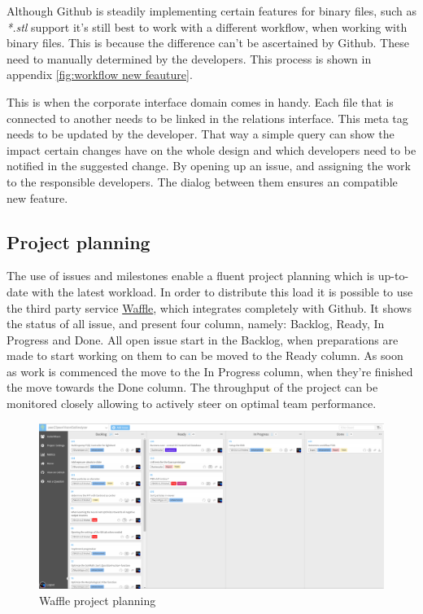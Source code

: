 \documentclass[fleqn,10pt]{SelfArx} %
\begin{document}
Although Github is steadily implementing certain features for binary files, such as \textit{*.stl} support it's still best to work with a different workflow, when working with binary files. This is because the difference can't be ascertained by Github. These need to manually determined by the developers. This process is shown in appendix \ref{fig:workflow new feauture}.

This is when the corporate interface domain comes in handy. Each file that is connected  to another needs to be linked in the relations interface. This meta tag needs to be updated by the developer. That way a simple query can show the impact certain changes have on the whole design and which developers need to be notified in the suggested change. By opening up an issue, and assigning the work to the responsible developers. The dialog between them ensures an compatible new feature. 

\subsection{Project planning}
The use of issues and milestones enable a fluent project planning which is up-to-date with the latest workload. In order to distribute this load it is possible to use the third party service \href{https://waffle.io}{\color{color1}Waffle}, which integrates completely with Github. It shows the status of all issue, and present four column, namely: Backlog, Ready, In Progress and Done. All open issue start in the Backlog, when preparations are made to start working on them to can be moved to the Ready column. As soon as work is commenced the move to the In Progress column, when they're finished the move towards the Done column. The throughput of the project can be monitored closely allowing to actively steer on optimal team performance. 
\begin{figure}[!hpt]
	\centering
	\includegraphics[width=\textwidth*\real{0.5}]{../images/waffle.png}
	\caption{Waffle project planning}\label{fig:waffle}
\end{figure}
\end{document}
